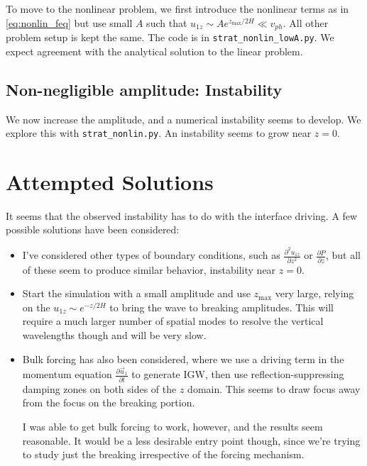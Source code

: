 \documentclass[11pt,
        usenames, %
        dvipsnames %
    ]{article}
\newcommand*{\pd}[2]{\frac{\partial#1}{\partial#2}}
\newcommand*{\ptd}[2]{\frac{\partial^2 #1}{\partial#2^2}}
\begin{document}
To move to the nonlinear problem, we first introduce the nonlinear terms as in
\autoref{eq:nonlin_feq} but use small $A$ such that $u_{1z} \sim
Ae^{z_{\max}/2H} \ll v_{ph}$. All other problem setup is kept the same. The code
is in \texttt{strat\_nonlin\_lowA.py}. We expect agreement with the analytical
solution to the linear problem.

\subsection{Non-negligible amplitude: Instability}

We now increase the amplitude, and a numerical instability seems to develop. We
explore this with \texttt{strat\_nonlin.py}. An instability seems to grow near
$z = 0$.

\section{Attempted Solutions}

It seems that the observed instability has to do with the interface driving. A
few possible solutions have been considered:
\begin{itemize}
    \item I've considered other types of boundary conditions, such as
        $\ptd{u_{1z}}{z}$ or $\pd{P}{z}$, but all of these seem to produce
        similar behavior, instability near $z = 0$.

    \item Start the simulation with a small amplitude and use $z_{\max}$ very
        large, relying on the $u_{1z} \sim e^{-z/2H}$ to bring the wave to
        breaking amplitudes. This will require a much larger number of spatial
        modes to resolve the vertical wavelengths though and will be very slow.

    \item Bulk forcing has also been considered, where we use a driving term in
        the momentum equation $\pd{\vec{u}_1}{t}$ to generate IGW, then use
        reflection-suppressing damping zones on both sides of the $z$ domain.
        This seems to draw focus away from the focus on the breaking portion.

        I was able to get bulk forcing to work, however, and the results seem
        reasonable. It would be a less desirable entry point though, since we're
        trying to study just the breaking irrespective of the forcing mechanism.
\end{itemize}
\end{document}
